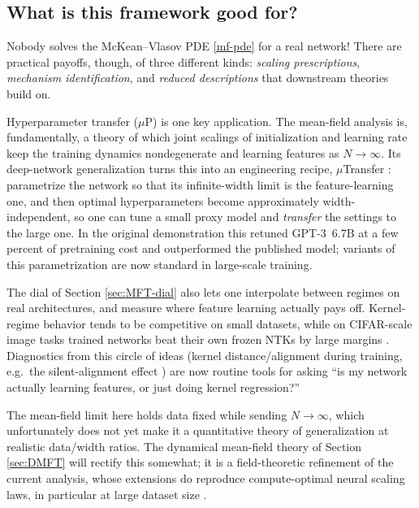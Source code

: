 \documentclass[11pt]{article}
\begin{document}
\subsection{What is this framework good for?}
\label{sec:MFT-practice}

Nobody solves the McKean--Vlasov PDE \eqref{mf-pde} for a real network! There are practical payoffs, though, of three different kinds: \emph{scaling prescriptions}, \emph{mechanism identification}, and \emph{reduced descriptions} that downstream theories build on.

Hyperparameter transfer ($\mu$P) is one key application. The mean-field analysis is, fundamentally, a theory of which joint scalings of initialization and learning rate keep the training dynamics nondegenerate and learning features as $N\to\infty$. Its deep-network generalization \cite{yang2021tensor} turns this into an engineering recipe, $\mu$Transfer \cite{yang2022tensor}: parametrize the network so that its infinite-width limit is the feature-learning one, and then optimal hyperparameters become approximately width-independent, so one can tune a small proxy model and \emph{transfer} the settings to the large one. In the original demonstration this retuned GPT-3~6.7B at a few percent of pretraining cost and outperformed the published model; variants of this parametrization are now standard in large-scale training. 

The dial of Section \ref{sec:MFT-dial} %
also lets one interpolate between regimes on real architectures, and measure where feature learning actually pays off. Kernel-regime behavior tends to be competitive on small datasets, while on CIFAR-scale image tasks trained networks beat their own frozen NTKs by large margins \cite{geiger2020disentangling}. Diagnostics from this circle of ideas (kernel distance/alignment during training, e.g.\ the silent-alignment effect \cite{atanasov2022silent}) are now routine tools for asking ``is my network actually learning features, or just doing kernel regression?''

The mean-field limit here holds data fixed while sending $N\to\infty$, which unfortunately does not yet make it a quantitative theory of generalization at realistic data/width ratios. The dynamical mean-field theory of Section \ref{sec:DMFT} \cite{bordelon2022self} will rectify this somewhat; it is a field-theoretic refinement of the current analysis, whose extensions do reproduce compute-optimal neural scaling laws, in particular at large dataset size \cite{bordelon2024dynamical}.
\end{document}
